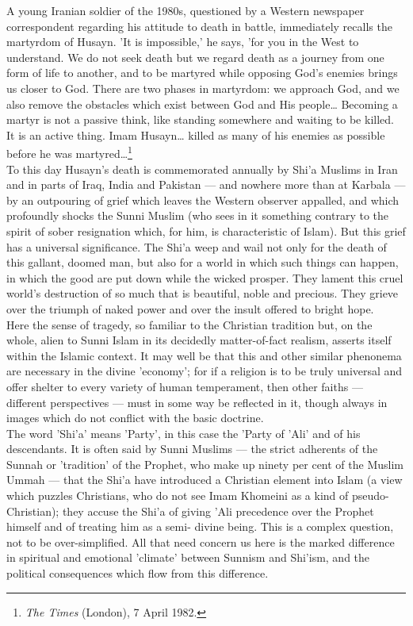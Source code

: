\documentclass[11pt, b5paper, twoside]{book}
\begin{document}
A young Iranian soldier of the 1980s, questioned by a Western newspaper correspondent regarding his 
attitude to death in battle, immediately recalls the martyrdom of Husayn. 'It is impossible,' he 
says, 'for you in the West to understand. We do not seek death but we regard death as a journey from 
one form of life to another, and to be martyred while opposing God's enemies brings us closer to God. 
There are two phases in martyrdom: we approach God, and we also remove the obstacles which exist 
between God and His people\ldots{} Becoming a martyr is not a passive think, like standing somewhere and 
waiting to be killed. It is an active thing. Imam Husayn\ldots{} killed as many of his enemies as possible 
before he was martyred\ldots{}\footnote{\emph{The Times} (London), 7 April 1982.}\\

To this day Husayn's death is commemorated annually by Shi'a Muslims in Iran and in parts of Iraq, 
India and Pakistan --- and nowhere more than at Karbala --- by an outpouring of grief which leaves the 
Western observer appalled, and which profoundly shocks the Sunni Muslim (who sees in it something 
contrary to the spirit of sober resignation which, for him, is characteristic of Islam). But this 
grief has a universal significance. The Shi'a weep and wail not only for the death of this gallant, 
doomed man, but also for a world in which such things can happen, in which the good are put down 
while the wicked prosper. They lament this cruel world's destruction of so much that is beautiful, 
noble and precious. They grieve over the triumph of naked power and over the insult offered to bright 
hope. \\

Here the sense of tragedy, so familiar to the Christian tradition but, on the whole, alien to Sunni 
Islam in its decidedly matter-of-fact realism, asserts itself within the Islamic context. It may well 
be that this and other similar phenonema are necessary in the divine 'economy'; for if a religion is 
to be truly universal and offer shelter to every variety of human temperament, then other faiths --- 
different perspectives --- must in some way be reflected in it, though always in images which do not 
conflict with the basic doctrine. \\

The word 'Shi'a' means 'Party', in this case the 'Party of 'Ali' and of his descendants. It is often 
said by Sunni Muslims --- the strict adherents of the Sunnah or 'tradition' of the Prophet, who make up 
ninety per cent of the Muslim Ummah --- that the Shi'a have introduced a Christian element into Islam 
(a view which puzzles Christians, who do not see Imam Khomeini as a kind of pseudo-Christian); they 
accuse the Shi'a of giving 'Ali precedence over the Prophet himself and of treating him as a semi-
divine being. This is a complex question, not to be over-simplified. All that need concern us here is 
the marked difference in spiritual and emotional 'climate' between Sunnism and Shi'ism, and the 
political consequences which flow from this difference. \\
\end{document}
